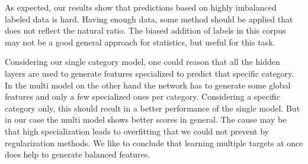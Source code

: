 \documentclass[11pt,a4paper]{article}
\begin{document}
As expected, our results show that predictions based on highly imbalanced labeled data is hard. Having enough data, some method should be applied that does not reflect the natural ratio. The biased addition of labels in this corpus may not be a good general approach for statistics, but useful for this task.

Considering our single category model, one could reason that all the hidden layers are used to generate features specialized to predict that specific category. 
In the multi model on the other hand the network has to generate some global features and only a few specialized ones per category. 
Considering a specific category only, this should result in a better performance of the single model.
But in our case the multi model shows better scores in general. 
The cause may be that high specialization leads to overfitting that we could not prevent by regularization methods.
We like to conclude that learning multiple targets at once does help to generate balanced features.




\appendix

\end{document}
